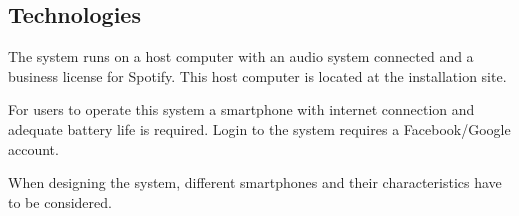 \subsection{Technologies}
\label{sub:pact_technologies}

The system runs on a host computer with an audio system connected and a business license for Spotify. This host computer is located at the installation site. 

For users to operate this system a smartphone with internet connection and adequate battery life is required. Login to the system requires a Facebook/Google account.

When designing the system, different smartphones and their characteristics have to be considered.
